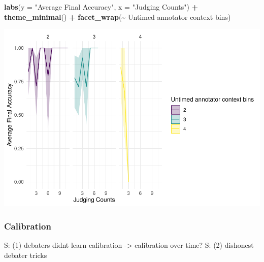 \documentclass[
]{article}
\newenvironment{Shaded}{\begin{snugshade}}{\end{snugshade}}
\newcommand{\AttributeTok}[1]{\textcolor[rgb]{0.13,0.29,0.53}{#1}}
\newcommand{\FunctionTok}[1]{\textcolor[rgb]{0.13,0.29,0.53}{\textbf{#1}}}
\newcommand{\NormalTok}[1]{#1}
\newcommand{\SpecialCharTok}[1]{\textcolor[rgb]{0.81,0.36,0.00}{\textbf{#1}}}
\newcommand{\StringTok}[1]{\textcolor[rgb]{0.31,0.60,0.02}{#1}}
\begin{document}
\begin{Shaded}
\begin{Highlighting}[]
  \FunctionTok{labs}\NormalTok{(}\AttributeTok{y =} \StringTok{"Average Final Accuracy"}\NormalTok{, }\AttributeTok{x =} \StringTok{"Judging Counts"}\NormalTok{) }\SpecialCharTok{+}
  \FunctionTok{theme\_minimal}\NormalTok{() }\SpecialCharTok{+}
  \FunctionTok{facet\_wrap}\NormalTok{(}\SpecialCharTok{\textasciitilde{}} \StringTok{\textasciigrave{}}\AttributeTok{Untimed annotator context bins}\StringTok{\textasciigrave{}}\NormalTok{)}
\end{Highlighting}
\end{Shaded}

\includegraphics[width=1\linewidth]{debate-2309_files/figure-latex/unnamed-chunk-3-2}

\subsubsection{Calibration}\label{calibration}

S: (1) debaters didnt learn calibration -\textgreater{} calibration over
time? S: (2) dishonest debater tricks
\end{document}

